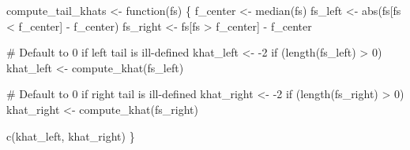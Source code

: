 \documentclass[
  letterpaper,
  DIV=11,
  numbers=noendperiod]{scrartcl}
\newenvironment{Shaded}{\begin{snugshade}}{\end{snugshade}}
\newcommand{\CommentTok}[1]{\textcolor[rgb]{0.37,0.37,0.37}{#1}}
\newcommand{\ControlFlowTok}[1]{\textcolor[rgb]{0.00,0.23,0.31}{#1}}
\newcommand{\DecValTok}[1]{\textcolor[rgb]{0.68,0.00,0.00}{#1}}
\newcommand{\FunctionTok}[1]{\textcolor[rgb]{0.28,0.35,0.67}{#1}}
\newcommand{\NormalTok}[1]{\textcolor[rgb]{0.00,0.23,0.31}{#1}}
\newcommand{\OtherTok}[1]{\textcolor[rgb]{0.00,0.23,0.31}{#1}}
\newcommand{\SpecialCharTok}[1]{\textcolor[rgb]{0.37,0.37,0.37}{#1}}
\begin{document}
\begin{Shaded}
\begin{Highlighting}[]
\NormalTok{compute\_tail\_khats }\OtherTok{\textless{}{-}} \ControlFlowTok{function}\NormalTok{(fs) \{}
\NormalTok{  f\_center }\OtherTok{\textless{}{-}} \FunctionTok{median}\NormalTok{(fs)}
\NormalTok{  fs\_left }\OtherTok{\textless{}{-}} \FunctionTok{abs}\NormalTok{(fs[fs }\SpecialCharTok{\textless{}}\NormalTok{ f\_center] }\SpecialCharTok{{-}}\NormalTok{ f\_center)}
\NormalTok{  fs\_right }\OtherTok{\textless{}{-}}\NormalTok{ fs[fs }\SpecialCharTok{\textgreater{}}\NormalTok{ f\_center] }\SpecialCharTok{{-}}\NormalTok{ f\_center}

  \CommentTok{\# Default to 0 if left tail is ill{-}defined}
\NormalTok{  khat\_left }\OtherTok{\textless{}{-}} \SpecialCharTok{{-}}\DecValTok{2}
  \ControlFlowTok{if}\NormalTok{ (}\FunctionTok{length}\NormalTok{(fs\_left) }\SpecialCharTok{\textgreater{}} \DecValTok{0}\NormalTok{)}
\NormalTok{    khat\_left }\OtherTok{\textless{}{-}} \FunctionTok{compute\_khat}\NormalTok{(fs\_left)}

  \CommentTok{\# Default to 0 if right tail is ill{-}defined}
\NormalTok{  khat\_right }\OtherTok{\textless{}{-}} \SpecialCharTok{{-}}\DecValTok{2}
  \ControlFlowTok{if}\NormalTok{ (}\FunctionTok{length}\NormalTok{(fs\_right) }\SpecialCharTok{\textgreater{}} \DecValTok{0}\NormalTok{)}
\NormalTok{    khat\_right }\OtherTok{\textless{}{-}} \FunctionTok{compute\_khat}\NormalTok{(fs\_right)}

  \FunctionTok{c}\NormalTok{(khat\_left, khat\_right)}
\NormalTok{\}}
\end{Highlighting}
\end{Shaded}
\end{document}
